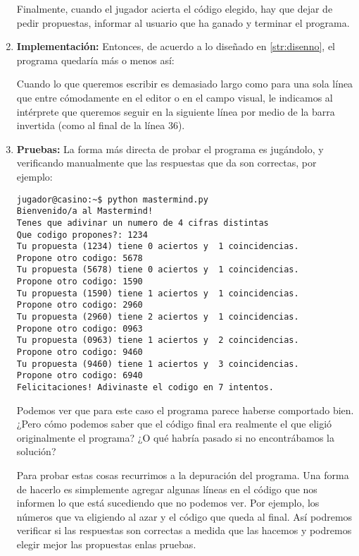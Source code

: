 \begin{enumerate}
Finalmente, cuando el jugador acierta el código elegido, hay que dejar de pedir
propuestas, informar al usuario que ha ganado y terminar el programa.

\item {\bf Implementación:}
Entonces, de acuerdo a lo diseñado en \ref{str:disenno}, el programa quedaría
más o menos así:



\begin{observacion}
Cuando lo que queremos escribir es demasiado largo como para una sola línea que
entre cómodamente en el editor o en el campo visual, le indicamos al intérprete
que queremos seguir en la siguiente línea por medio de la barra invertida (como
al final de la línea 36).
\end{observacion}

\item {\bf Pruebas:}
La forma más directa de probar el programa es jugándolo, y verificando
manualmente que las respuestas que da son correctas, por ejemplo:

\begin{verbatim}
jugador@casino:~$ python mastermind.py
Bienvenido/a al Mastermind!
Tenes que adivinar un numero de 4 cifras distintas
Que codigo propones?: 1234
Tu propuesta (1234) tiene 0 aciertos y  1 coincidencias.
Propone otro codigo: 5678
Tu propuesta (5678) tiene 0 aciertos y  1 coincidencias.
Propone otro codigo: 1590
Tu propuesta (1590) tiene 1 aciertos y  1 coincidencias.
Propone otro codigo: 2960
Tu propuesta (2960) tiene 2 aciertos y  1 coincidencias.
Propone otro codigo: 0963
Tu propuesta (0963) tiene 1 aciertos y  2 coincidencias.
Propone otro codigo: 9460
Tu propuesta (9460) tiene 1 aciertos y  3 coincidencias.
Propone otro codigo: 6940
Felicitaciones! Adivinaste el codigo en 7 intentos.
\end{verbatim}

Podemos ver que para este caso el programa parece haberse comportado bien.
¿Pero cómo podemos saber que el código final era realmente el que eligió
originalmente el programa? ¿O qué habría pasado si no encontrábamos la
solución?

Para probar estas cosas recurrimos a la depuración del programa. Una forma
de hacerlo es simplemente agregar algunas líneas en el código que nos
informen lo que está sucediendo que no podemos ver. Por ejemplo, los
números que va eligiendo al azar y el código que queda al final. Así
podremos verificar si las respuestas son correctas a medida que las hacemos
y podremos elegir mejor las propuestas enlas pruebas.


\end{enumerate}
